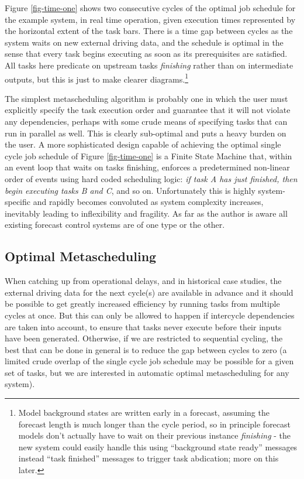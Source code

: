 \documentclass[11pt,a4paper]{article}
\begin{document}
Figure \ref{fig-time-one} shows two consecutive cycles of the optimal
job schedule for the example system, in real time operation, given
execution times represented by the horizontal extent of the task bars.
There is a time gap between cycles as the system waits on new external
driving data, and the schedule is optimal in the sense that every task
begins executing as soon as its prerequisites are satisfied. All tasks
here predicate on upstream tasks {\em finishing} rather than on
intermediate outputs, but this is just to make clearer
diagrams.\footnote{Model background states are written early in a
forecast, assuming the forecast length is much longer than the cycle
period, so in principle forecast models don't actually have to wait on
their previous instance {\em finishing} - the new system could easily
handle this using ``background state ready'' messages instead ``task
finished'' messages to trigger task abdication; more on this later.}   

The simplest metascheduling algorithm is probably one in which the user
must explicitly specify the task execution order and guarantee that it
will not violate any dependencies, perhaps with some crude means of
specifying tasks that can run in parallel as well. This is clearly
sub-optimal and puts a heavy burden on the user. A more sophisticated
design capable of achieving the optimal single cycle job schedule of
Figure \ref{fig-time-one} is a Finite State Machine that, within an
event loop that waits on tasks finishing, enforces a predetermined
non-linear order of events using hard coded scheduling logic: {\em if
task A has just finished, then begin executing tasks B and C}, and so
on. Unfortunately this is highly system-specific and rapidly becomes
convoluted as system complexity increases, inevitably leading to
inflexibility and fragility.  As far as the author is aware all existing
forecast control systems are of one type or the other.
\subsection{Optimal Metascheduling}

When catching up from operational delays, and in historical case
studies, the external driving data for the next cycle(s) are available
in advance and it should be possible to get greatly increased efficiency
by running tasks from multiple cycles at once.  But this can only be
allowed to happen if intercycle dependencies are taken into account, to
ensure that tasks never execute before their inputs have been generated.
Otherwise, if we are restricted to sequential cycling, the best that can
be done in general is to reduce the gap between cycles to zero (a
limited crude overlap of the single cycle job schedule may be possible
for a given set of tasks, but we are interested in automatic optimal
metascheduling for any system).
\end{document}
